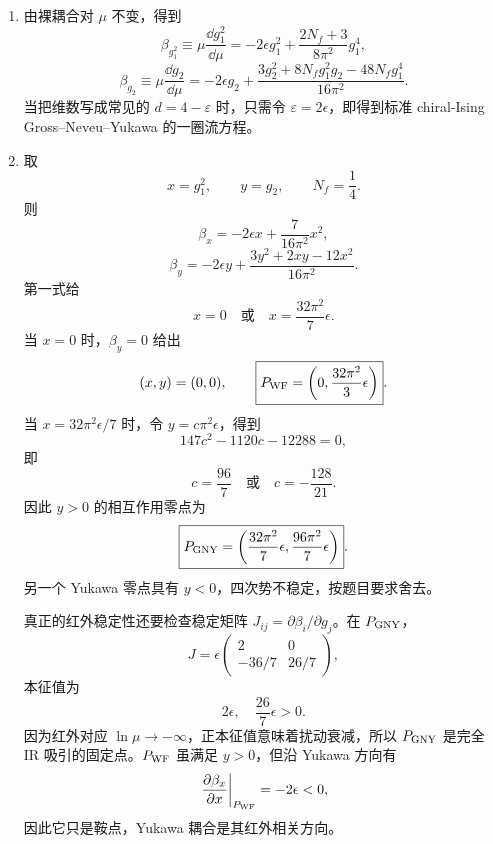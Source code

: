 \begin{question}[20 分]
\begin{solution}
\begin{enumerate}
  为后续 beta 函数，MS 下还可写出完整耦合重整化的单极点：
  \[
  Z_1=1+\frac{(2N_f+3)g_1^2}{32\pi^2\epsilon}+\mathcal O(g^4),
  \]
  以及更适合在 $g_2\to0$ 时使用的加性形式
  \[
  g_{2,0}=\mu^{2\epsilon}\left[g_2+\frac{3g_2^2+8N_fg_1^2g_2-48N_fg_1^4}{32\pi^2\epsilon}\right].
  \]

  \item 由裸耦合对 $\mu$ 不变，得到
  \[
  \boxed{
  \beta_{g_1^2}\equiv\mu\frac{\dd{g_1^2}}{\dd\mu}
  =-2\epsilon g_1^2
  +\frac{2N_f+3}{8\pi^2}g_1^4},
  \]
  \[
  \boxed{
  \beta_{g_2}\equiv\mu\frac{\dd{g_2}}{\dd\mu}
  =-2\epsilon g_2
  +\frac{3g_2^2+8N_fg_1^2g_2-48N_fg_1^4}{16\pi^2}}.
  \]
  当把维数写成常见的 $d=4-\varepsilon$ 时，只需令 $\varepsilon=2\epsilon$，即得到标准 chiral-Ising Gross--Neveu--Yukawa 的一圈流方程。

  \item 取
  \[
  x=g_1^2,\qquad y=g_2,\qquad N_f=\frac14.
  \]
  则
  \[
  \beta_x=-2\epsilon x+\frac{7}{16\pi^2}x^2,
  \]
  \[
  \beta_y=-2\epsilon y+\frac{3y^2+2xy-12x^2}{16\pi^2}.
  \]
  第一式给
  \[
  x=0\quad\text{或}\quad x=\frac{32\pi^2}{7}\epsilon.
  \]
  当 $x=0$ 时，$\beta_y=0$ 给出
  \[
  (x,y)=(0,0),\qquad
  \boxed{P_{\rm WF}=\left(0,\frac{32\pi^2}{3}\epsilon\right)}.
  \]
  当 $x=32\pi^2\epsilon/7$ 时，令 $y=c\pi^2\epsilon$，得到
  \[
  147c^2-1120c-12288=0,
  \]
  即
  \[
  c=\frac{96}{7}\quad\text{或}\quad c=-\frac{128}{21}.
  \]
  因此 $y>0$ 的相互作用零点为
  \[
  \boxed{P_{\rm GNY}=\left(
  \frac{32\pi^2}{7}\epsilon,
  \frac{96\pi^2}{7}\epsilon\right)}.
  \]
  另一个 Yukawa 零点具有 $y<0$，四次势不稳定，按题目要求舍去。

  真正的红外稳定性还要检查稳定矩阵 $J_{ij}=\partial\beta_i/\partial g_j$。在 $P_{\rm GNY}$，
  \[
  J=\epsilon\begin{pmatrix}
  2&0\\[-1mm]
  -36/7&26/7
  \end{pmatrix},
  \]
  本征值为
  \[
  \boxed{2\epsilon,\quad \frac{26}{7}\epsilon>0}.
  \]
  因为红外对应 $\ln\mu\to-\infty$，正本征值意味着扰动衰减，所以 $P_{\rm GNY}$ 是完全 IR 吸引的固定点。$P_{\rm WF}$ 虽满足 $y>0$，但沿 Yukawa 方向有
  \[
  \left.\frac{\partial\beta_x}{\partial x}\right|_{P_{\rm WF}}=-2\epsilon<0,
  \]
  因此它只是鞍点，Yukawa 耦合是其红外相关方向。


\end{enumerate}
\end{solution}
\end{question}
